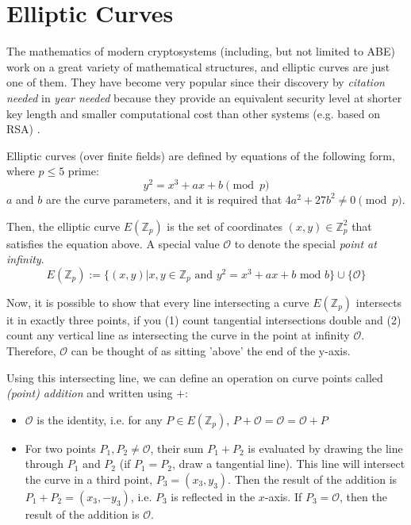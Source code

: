 \section{Elliptic Curves}

The mathematics of modern cryptosystems (including, but not limited to ABE) work on a great variety of mathematical structures, and elliptic curves are just one of them.
They have become very popular since their discovery by \emph{citation needed} in \emph{year needed} because they provide an equivalent security level at shorter key length and smaller computational cost than other systems (e.g. based on RSA) \cite{katz_introduction_2015}.

Elliptic curves (over finite fields) are defined by equations of the following form, where $p \leq 5$ prime: \cite{katz_introduction_2015}
\begin{equation}
    y^2 = x^3 + a x + b \pmod{p}
\end{equation}
$a$ and $b$ are the curve parameters, and it is required that $4a^2 + 27b^2 \neq 0 \pmod{p}$.\cite{katz_introduction_2015}

Then, the elliptic curve $E(\mathbb{Z}_p)$ is the set of coordinates $(x, y) \in \mathbb{Z}_p^2$ that satisfies the equation above. 
A special value $\mathcal{O}$ to denote the special \emph{point at infinity}. \cite{katz_introduction_2015}
\begin{equation}
    E(\mathbb{Z}_p) := \{(x, y) | x,y \in \mathbb{Z}_p \text{ and } y^2 = x^3 + a x + b \text{ mod } b\} \cup \{\mathcal{O}\}
\end{equation}

Now, it is possible to show that every line intersecting a curve $E(\mathbb{Z}_p)$ intersects it in exactly three points, if you (1) count tangential intersections double and (2) count any vertical line as intersecting the curve in the point at infinity $\mathcal{O}$.
Therefore, $\mathcal{O}$ can be thought of as sitting 'above' the end of the y-axis.\cite{katz_introduction_2015}

Using this intersecting line, we can define an operation on curve points called \emph{(point) addition} and written using $+$: \cite{katz_introduction_2015}

\begin{itemize}
    \item $\mathcal{O}$ is the identity, i.e. for any $P \in E(\mathbb{Z}_p)$, $P + \mathcal{O} = \mathcal{O} = \mathcal{O} + P$ 
    \item For two points $P_1, P_2 \neq \mathcal{O}$, their sum $P_1 + P_2$ is evaluated by drawing the line through $P_1$ and $P_2$ (if $P_1 = P_2$, draw a tangential line). 
        This line will intersect the curve in a third point, $P_3 = (x_3, y_3)$.
        Then the result of the addition is $P_1 + P_2 = (x_3, -y_3)$, i.e. $P_3$ is reflected in the $x$-axis.
        If $P_3 = \mathcal{O}$, then the result of the addition is $\mathcal{O}$.
\end{itemize}

